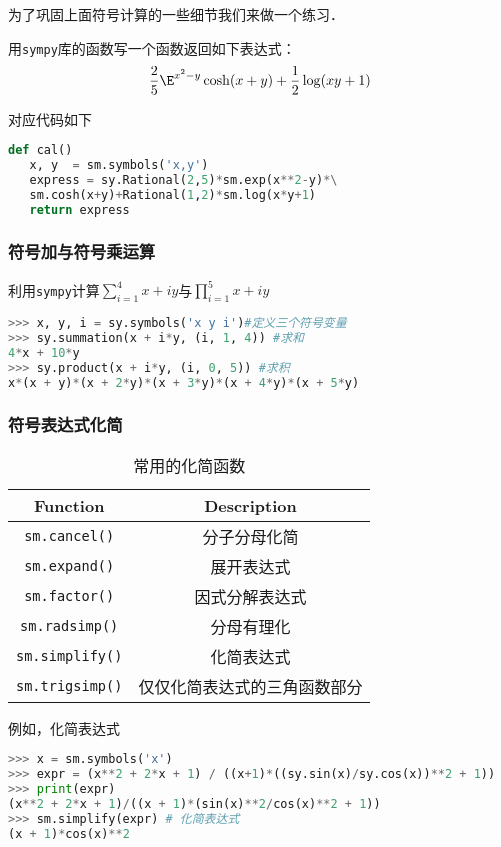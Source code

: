 为了巩固上面符号计算的一些细节我们来做一个练习．
\begin{example}{}
用\verb|sympy|库的函数写一个函数返回如下表达式：
\begin{align}
\frac{2}{5}\E^{x^2-y}\cosh(x+y)+\frac{1}{2}\log(xy+1)
\end{align}


对应代码如下
\begin{lstlisting}[language=python]
def cal()
   x, y  = sm.symbols('x,y')
   express = sy.Rational(2,5)*sm.exp(x**2-y)*\
   sm.cosh(x+y)+Rational(1,2)*sm.log(x*y+1)
   return express

\end{lstlisting}
\end{example}

\subsubsection{符号加与符号乘运算}
利用\verb|sympy|计算$\sum_{i=1}^4{x+iy}$与$\prod_{i=1}^5{x+iy}$
\begin{lstlisting}[language=python]
>>> x, y, i = sy.symbols('x y i')#定义三个符号变量
>>> sy.summation(x + i*y, (i, 1, 4)) #求和
4*x + 10*y
>>> sy.product(x + i*y, (i, 0, 5)) #求积
x*(x + y)*(x + 2*y)*(x + 3*y)*(x + 4*y)*(x + 5*y)
\end{lstlisting}

\subsubsection{符号表达式化简}
\begin{table}[ht]
\centering
\caption{常用的化简函数}\label{SymPy_tab1}
\begin{tabular}{c|c}
Function &Description \\
\hline
\verb|sm.cancel()| &分子分母化简 \\
\hline
\verb|sm.expand()| &展开表达式\\
\hline
\verb|sm.factor()| &因式分解表达式\\
\hline
\verb|sm.radsimp()| &分母有理化\\
\hline
\verb|sm.simplify()| &化简表达式\\
\hline
\verb|sm.trigsimp()| &仅仅化简表达式的三角函数部分\\
\hline
\end{tabular}
\end{table}

例如，化简表达式
\begin{lstlisting}[language=python]
>>> x = sm.symbols('x')
>>> expr = (x**2 + 2*x + 1) / ((x+1)*((sy.sin(x)/sy.cos(x))**2 + 1))
>>> print(expr)
(x**2 + 2*x + 1)/((x + 1)*(sin(x)**2/cos(x)**2 + 1))
>>> sm.simplify(expr) # 化简表达式
(x + 1)*cos(x)**2
\end{lstlisting}

